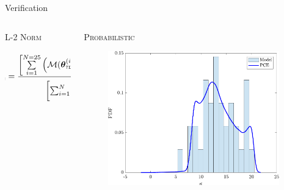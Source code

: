 \documentclass[xcolor={x11names,table},compress,svgnames,mathserif]{beamer}
\renewcommand{\(}{\begin{columns}}
\renewcommand{\)}{\end{columns}}
\newcommand{\<}[1]{\begin{column}{#1}}
\renewcommand{\>}{\end{column}}
\newcommand{\be}{\begin{equation}}
\newcommand{\ee}{\end{equation}}
\begin{document}
\begin{frame}{Verification}

\begin{columns}
\begin{column}{0.6\textwidth}
\textsc{L-2 Norm}
\vspace{5mm}
\begin{center}
\scriptsize
\begin{tcolorbox}[width=1.1\textwidth,colback=DeepSkyBlue!20,notitle,colframe=DeepSkyBlue!20,colupper=DeepSkyBlue4]
\vspace{-2mm}
\be
\hspace{-5mm}
\epsilon_{\mbox{\tiny{L-2}}} = 
\frac{\left[\sum\limits_{i=1}^{N=25}\left(\mathcal{M}(\bm{\theta}_{\mbox{\tiny{7D}}}^{(i)}) - 
\mathcal{M}^{PCE}(\bm{\theta}_{\mbox{\tiny{5D}}}^{(i)})\right)^{2}\right]^{\frac{1}{2}}}{\left[\sum_{i=1}^{N}
\left(\mathcal{M}(\bm{\theta}_{\mbox{\tiny{7D}}}^{(i)})\right)^2\right]^{\frac{1}{2}}} \rightarrow \mathcal{O}(10^{-2})
\nonumber
\ee
\end{tcolorbox}
\end{center}

\end{column}

\hspace{3mm}
\begin{column}{0.4\textwidth}
\hspace{5mm}\textsc{Probabilistic}

\begin{center}
\begin{figure}[htbp]
\hspace{12mm}
  \includegraphics[width=0.95\textwidth]{./Figures/PCE5D_kde}
  \end{figure}
\end{center}

\end{column}
\end{columns}

\end{frame}
\end{document}
